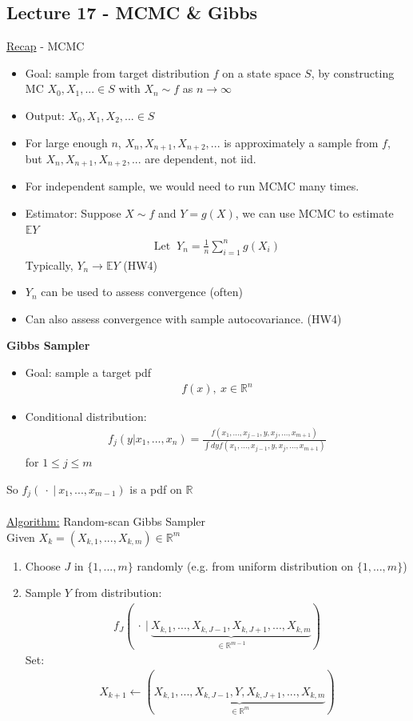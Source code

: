 \documentclass[12pt, letterpaper]{article}
\begin{document}
\subsection{Lecture 17 - MCMC \& Gibbs}
\underline{Recap} - MCMC
\begin{itemize}
    \item Goal: sample from target distribution $f$ on a state space $S$, by constructing
    MC $X_0, X_1,... \in S$ with $X_n \sim f$ as $n \rightarrow \infty$
    \item Output: $X_0, X_1, X_2, ... \in S$
    \item For large enough $n$, $X_n, X_{n+1}, X_{n+2}, ...$ is approximately a sample 
    from $f$, but $X_n, X_{n+1}, X_{n+2}, ...$ are dependent, not iid.
    \item For independent sample, we would need to run MCMC many times.
    \item Estimator: Suppose $X\sim f$ and $Y = g(X)$, we can use MCMC to estimate $\mathbb{E}Y$
    \begin{align*}
        \text{Let }\ Y_n = \frac 1n \sum_{i=1}^{n}g(X_i)
    \end{align*}
    Typically, $Y_n \rightarrow \mathbb{E}Y$ (HW4)
    \item $Y_n$ can be used to assess convergence (often)
    \item Can also assess convergence with sample autocovariance. (HW4)
\end{itemize}
\textbf{Gibbs Sampler}
\begin{itemize}
    \item Goal: sample a target pdf
    \begin{align*}
        f(x),\ x \in \mathbb{R}^n
    \end{align*}
    \item Conditional distribution:
    \begin{align*}
        f_j (y | x_1, ..., x_n) = \frac{f(x_1,...,x_{j-1},y,x_{j},...,x_{m+1})}{\int dy f(x_1,...,x_{j-1},y,x_{j},...,x_{m+1})}
    \end{align*}
    for $1 \le j \le m$
\end{itemize}
So $f_j (\ \cdot\ |\ x_1,..., x_{m-1})$ is a pdf on $\mathbb{R}$ \\ \\
\underline{Algorithm:} Random-scan Gibbs Sampler \\
Given $X_k = (X_{k,1},..., X_{k,m}) \in \mathbb{R}^m$
\begin{enumerate}
    \item Choose $J$ in $\{1,...,m\}$ randomly (e.g. from uniform distribution on $\{1,...,m\}$)
    \item Sample $Y$ from distribution: 
    \begin{align*}
        f_J (\ \cdot\ |\ \underbrace{X_{k,1},..., X_{k,J-1}, X_{k,J+1}, ..., X_{k,m}}_{\in \mathbb{R}^{m-1}})
    \end{align*}
    Set: 
    \begin{align*}
        X_{k+1} \leftarrow (\underbrace{X_{k,1},..., X_{k,J-1}, Y, X_{k,J+1},..., X_{k,m}}_{\in \mathbb{R}^m})
    \end{align*}
\end{enumerate}
\end{document}
